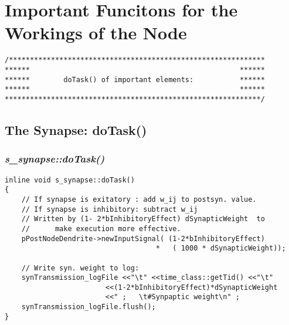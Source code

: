 




\chapter{Important Funcitons for the Workings of the Node} %
\label{appendixDifferentDoTaskFunctions} 

\begin{lstlisting}
/*************************************************************
****** 													******
****** 		  doTask() of important elements: 			******
****** 													******
*************************************************************/
\end{lstlisting}


\section{The Synapse: doTask()}
\label{appendixDoTaskForSynapse}
\subsection{\emph{s\_synapse::doTask()}}
\begin{lstlisting}
inline void s_synapse::doTask()
{
	// If synapse is exitatory : add w_ij to postsyn. value.
	// If synapse is inhibitory: subtract w_ij
	// Written by (1- 2*bInhibitoryEffect) dSynapticWeight  to 
	// 		make execution more effective.
 	pPostNodeDendrite->newInputSignal( (1-2*bInhibitoryEffect) 
									* 	( 1000 * dSynapticWeight)); 

	// Write syn. weight to log:
	synTransmission_logFile <<"\t" <<time_class::getTid() <<"\t" 
						<<(1-2*bInhibitoryEffect)*dSynapticWeight
						<<" ;   \t#Synpaptic weight\n" ;
	synTransmission_logFile.flush();
}
\end{lstlisting}




